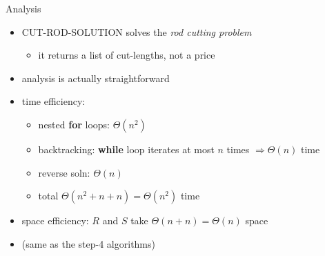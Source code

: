 \documentclass{beamer}
\begin{document}
\begin{frame}{Analysis}
  \begin{itemize}
    \item CUT-ROD-SOLUTION solves the \emph{rod cutting problem}
    \begin{itemize}
      \item it returns a list of cut-lengths, not a price
    \end{itemize}
    \item analysis is actually straightforward
    \item time efficiency:
    \begin{itemize}
      \item nested \textbf{for} loops: $\Theta(n^2)$
      \item backtracking: \textbf{while} loop iterates at most $n$ times $\Rightarrow \Theta(n)$ time
      \item reverse soln: $\Theta(n)$
      \item total $\Theta(n^2+n+n)=\Theta(n^2)$ time
    \end{itemize}
    \item space efficiency: $R$ and $S$ take $\Theta(n+n)=\Theta(n)$ space
    \item (same as the step-4 algorithms)
  \end{itemize}
\end{frame}
\end{document}
